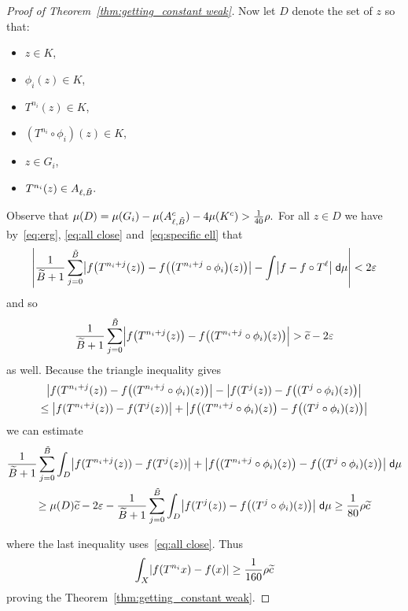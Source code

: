 \documentclass[AHL,Unicode,longabstracts,published]{cedram}
\newcommand{\intd}{\;\mathsf{d}}
\let\originalleft\left
\let\originalright\right
\renewcommand{\left}{\mathopen{}\mathclose\bgroup\originalleft}
\renewcommand{\right}{\aftergroup\egroup\originalright}
\let\oldtilde\tilde
\renewcommand*{\tilde}[1]{\mathchoice{\widetilde{#1}}{\widetilde{#1}}{\oldtilde{#1}}{\oldtilde{#1}}}
\begin{document}
\begin{proof}[Proof of Theorem~\ref{thm:getting_constant weak}]
Now let $D$ denote the set of $z$ so that:
\begin{itemize}
\item $z \in K$,
\item $\phi_i(z) \in K$,
\item $T^{n_i}(z) \in K$,
\item $(T^{n_i} \circ \phi_i)(z)\in K$,
\item $z \in G_i$,
\item $T^{n_i}(z) \in A_{\ell,\tilde{B}}.$
\end{itemize}
Observe that $\mu(D)=\mu(G_i)-\mu(A_{\ell,\tilde{B}}^c)-4 \mu(K^c)>\frac 1 {40}\rho.$ For all $z\in D$ we have by~\eqref{eq:erg}, \eqref{eq:all close} and~\eqref{eq:specific ell} that
\[
\left| \frac{1}{\tilde{B}+1} \sum_{j=0}^{\tilde{B}} \left|f\left(T^{n_i+j}(z)\right)-f\left(\left(T^{n_i+j} \circ \phi_i\right)(z)\right)\right| - \int \left|f-f \circ T^\ell\right| \intd\mu\right| < 2\varepsilon
\]
and so
\[
\frac{1}{\tilde{B}+1} \sum_{j=0}^{\tilde{B}} \Bigl| f\left(T^{n_i+j}(z)\right)-f\left((T^{n_i+j} \circ \phi_i)(z)\right) \Bigr| > \tilde{c} - 2\varepsilon
\]
as well. Because the triangle inequality gives
\begin{multline*}
\left|f(T^{n_i+j}(z))-f\left((T^{n_i+j} \circ \phi_i)(z)\right)\right|-
\left|f(T^j(z))-f\left((T^j \circ \phi_i)(z)\right)\right|\\
\leq 
\left|f(T^{n_i+j}(z))-f(T^j(z))\right|+\left|f\left((T^{n_i+j} \circ \phi_i)(z)\right)-f\left((T^j\circ \phi_i)(z)\right)\right|
\end{multline*}
we can estimate
\begin{multline*}
\frac{1}{\tilde{B}+1} \sum_{j=0}^{\tilde{B}}\int_{D} \left| f(T^{n_i+j}(z))-f(T^j(z)) \right| + \left| f\left((T^{n_i+j} \circ \phi_i)(z)\right)-f\left((T^j \circ \phi_i)(z)\right) \right| \intd\mu
\\
\ge\mu(D) \tilde{c} - 2\varepsilon - \frac{1}{\tilde{B}+1} \sum_{j=0}^{\tilde{B}}\int_{D} \left|f(T^j(z))-f\left((T^j \circ \phi_i)(z)\right)\right| \intd \mu\geq \frac{1}{80} \rho \tilde{c}
\end{multline*}

\pagebreak{}
\noindent
where the last inequality uses~\eqref{eq:all close}. Thus
\begin{equation}\label{eq:not rigid}
\int_X \left|f(T^{n_i}x)-f(x)\right|\geq \frac 1 {160} \rho \tilde{c}
\end{equation}
proving the Theorem~\ref{thm:getting_constant weak}.
\end{proof}
\end{document}
